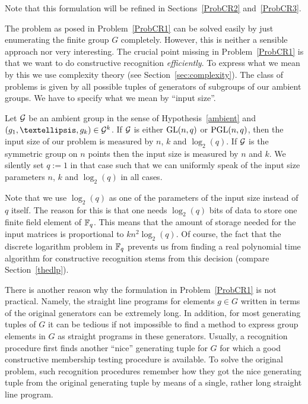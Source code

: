 Note that this formulation will be refined in Sections~\ref{ProbCR2} 
and~\ref{ProbCR3}.

\smallskip
The problem as posed in Problem~\ref{ProbCR1} can be solved easily by just
enumerating the finite group $G$ completely. However, this is neither
a sensible approach nor very interesting. The crucial point missing
in Problem~\ref{ProbCR1} is that we want to do constructive recognition
\emph{efficiently}. To express what we mean by this we use complexity
theory (see Section~\ref{sec:complexity}). 
The class of problems is given by all possible tuples of
generators of subgroups of our ambient groups. We have to specify
what we mean by ``input size''.

\begin{Def}
\label{inputsize}
%
Let $\mathcal{G}$ be an ambient group in the sense of Hypothesis~\ref{ambient}
and $(g_1, \ldots, g_k) \in \GG^k$. If $\mathcal{G}$ is either $\GL(n,q)$ or
$\PGL(n,q)$, then the input size of our problem is measured by $n$, $k$
and $\log_2(q)$. If $\mathcal{G}$ is the symmetric group on $n$ points then the
input size is measured by $n$ and $k$. We silently set $q := 1$ in that
case such that we can uniformly speak of the input size parameters $n$, $k$
and $\log_2(q)$ in all cases.
\end{Def}

\begin{Rem}
Note that we use $\log_2(q)$ as one of the parameters of the input size
instead of $q$ itself. The reason for this is that one needs
$\log_2(q)$ bits of data to store one finite field element of $\mathbb{F}_q$.
This means that the amount of storage needed for the input matrices is
proportional to $kn^2\log_2(q)$. Of course, the fact that the discrete
logarithm problem in $\mathbb{F}_q$ prevents us from finding a real polynomial
time algorithm for constructive recognition stems from this decision
(compare Section~\ref{thedlp}).
\proofend
\end{Rem}

There is another reason why the formulation in Problem~\ref{ProbCR1} is not
practical. Namely, the straight line programs for elements $g \in G$
written in terms of the original generators can be extremely long. In
addition, for most generating tuples of $G$ it can be tedious if not
impossible to find a method to express group elements in $G$ as straight
programs in these generators. Usually, a recognition procedure first finds
another ``nice'' generating tuple for $G$ for which a good constructive
%
membership testing procedure is available. To solve the original problem,
such recognition procedures remember how they got the nice generating
tuple from the original generating tuple by means of a single, rather long
straight line program.
%


